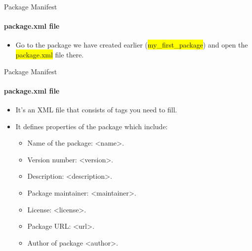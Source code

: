 \documentclass{beamer}
\begin{document}
\begin{frame}{Package Manifest}
    \framesubtitle{package.xml file}
    
    \begin{itemize}
        \item Go to the package we have created earlier ({\ttfamily \colorbox{yellow}{my\_first\_package}}) and open the {\ttfamily \colorbox{yellow}{package.xml}} file there.
    \end{itemize}
   \end{frame} 
   
    
   \begin{frame}{Package Manifest}
       \framesubtitle{package.xml file}
   
        \begin{itemize}
            \item It's an XML file that consists of tags you need to fill.
            
            \item It defines properties of the package which include:
            \begin{itemize}
                \item Name of the package: {\color{red}<name>}.
                \item Version number: {\color{red}<version>}.
                \item Description: {\color{red}<description>}.
                \item Package maintainer: {\color{red}<maintainer>}.
                \item License: {\color{red}<license>}.
                \item Package URL: {\color{red}<url>}.
                \item Author of package {\color{red}<author>}.
            \end{itemize}
        \end{itemize}
    
\end{frame}
\end{document}
